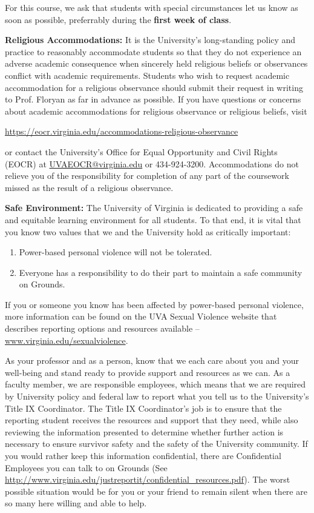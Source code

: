 \documentclass[12pt]{article}
\begin{document}
For this course, we ask that students with special circumstances let us know as soon as possible, preferrably during the \textbf{first week of class}.

\textbf{Religious Accommodations:} It is the University's long-standing policy and practice to reasonably accommodate students so that they do not experience an adverse academic consequence when sincerely held religious beliefs or observances conflict with academic requirements.  Students who wish to request academic accommodation for a religious observance should submit their request in writing to Prof. Floryan as far in advance as possible. If you have questions or concerns about academic accommodations for religious observance or religious beliefs, visit 

\begin{center} 
    \url{https://eocr.virginia.edu/accommodations-religious-observance}
\end{center}

or contact the University's Office for Equal Opportunity and Civil Rights (EOCR) at \url{UVAEOCR@virginia.edu} or 434-924-3200.  Accommodations do not relieve you of the responsibility for completion of any part of the coursework missed as the result of a religious observance.

\textbf{Safe Environment:} The University of Virginia is dedicated to providing a safe and equitable learning environment for all students. To that end, it is vital that you know two values that we and the University hold as critically important:
 
\begin{enumerate}
    \item Power-based personal violence will not be tolerated. 
    \item Everyone has a responsibility to do their part to maintain a safe community on Grounds.
\end{enumerate}

If you or someone you know has been affected by power-based personal violence, more information can be found on the UVA Sexual Violence website that describes reporting options and resources available -- \url{www.virginia.edu/sexualviolence}. 
   
As your professor and as a person, know that we each care about you and your well-being and stand ready to provide support and resources as we can. As a faculty member, we are responsible employees, which means that we are required by University policy and federal law to report what you tell us to the University's Title IX Coordinator. The Title IX Coordinator's job is to ensure that the reporting student receives the resources and support that they need, while also reviewing the information presented to determine whether further action is necessary to ensure survivor safety and the safety of the University community. If you would rather keep this information confidential, there are Confidential Employees you can talk to on Grounds (See \url{http://www.virginia.edu/justreportit/confidential\_resources.pdf}). The worst possible situation would be for you or your friend to remain silent when there are so many here willing and able to help.
\end{document}

